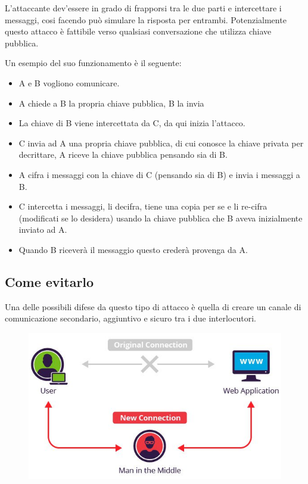 L'attaccante dev'essere in grado di frapporsi tra le due parti e intercettare i messaggi, cosi facendo può simulare la risposta per entrambi.
Potenzialmente questo attacco è fattibile verso qualsiasi conversazione che utilizza chiave pubblica.


Un esempio del suo funzionamento è il seguente:
\begin{itemize}
\item	A e B vogliono comunicare.
\item	A chiede a B la propria chiave pubblica, B la invia
\item	La chiave di B viene intercettata da C, da qui inizia l'attacco.
\item	C invia ad A una propria chiave pubblica, di cui conosce la chiave privata per decrittare, A riceve la chiave pubblica pensando sia di B.
\item	A cifra i messaggi con la chiave di C (pensando sia di B) e invia i messaggi a B.
\item	C intercetta i messaggi, li decifra, tiene una copia per se e li re-cifra (modificati se lo desidera) usando la chiave pubblica che B aveva inizialmente inviato ad A.
\item	Quando B riceverà il messaggio questo crederà provenga da A.
\end{itemize}

\subsection{Come evitarlo}
Una delle possibili difese da questo tipo di attacco è quella di creare un canale di comunicazione secondario, aggiuntivo e sicuro tra i due interlocutori.

\begin{figure}[H]
\centering
\includegraphics[scale=0.6]{res/img/64_MITM.png}
\end{figure}


